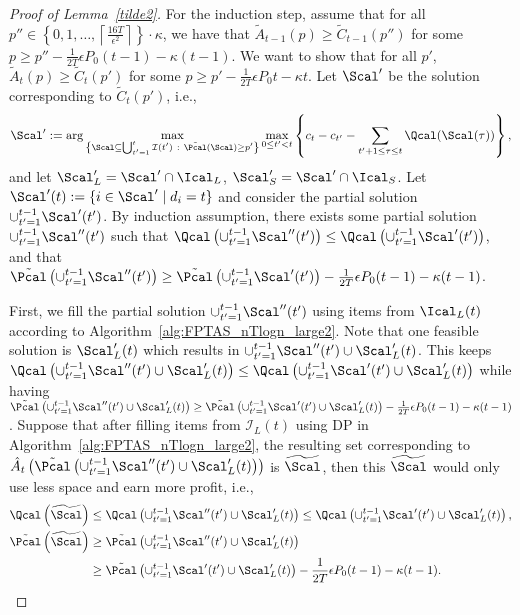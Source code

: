 \begin{proof}[Proof of Lemma~\ref{tilde2}]
	For the induction step, assume that for all $p''\in \left\{ 0, 1, \ldots,\left\lceil\frac{16T}{\epsilon^2}\right\rceil \right\} \cdot \kappa$, we have that $\widetilde{A}_{t-1}(p) \ge \widetilde{C}_{t-1}(p'')$ for some $p\ge p''-\frac{1}{2T}\epsilon P_0(t-1)-\kappa (t-1)$. We want to show that for all $p'$, $\widetilde{A}_{t}(p) \ge \widetilde{C}_{t}(p')$ for some $p\ge p'-\frac{1}{2T}\epsilon P_0t-\kappa t$. Let $\Scal'$ be the solution corresponding to $\widetilde{C}_t(p')$, i.e., $$\Scal' :=\arg\max_{\left\{\substack{
			\Scal \subseteq \bigcup_{t'=1}^t\mathcal{I}(t')\ :\  \tilde{\Pcal}(\Scal)\ge p'}
		\right\}} \max_{0 \leq t' < t}\left\{ c_t - c_{t'} - \sum_{t'+1 \leq \tau \leq  t} \Qcal(\Scal(\tau)) \right\},$$ and let $\Scal_L'=\Scal'\cap \Ical_L$, $\Scal'_S= \Scal'\cap\Ical_S$.
	Let $\Scal'(t) := \{i\in \Scal'\mid d_i=t\}$ and consider the partial solution $\cup_{t'=1}^{t-1}\Scal'(t')$. By induction assumption, there exists some partial solution $\cup_{t'=1}^{t-1}\Scal''(t')$ such that $\Qcal\left(\cup_{t'=1}^{t-1}\Scal''(t')\right)\le \Qcal\left(\cup_{t'=1}^{t-1}\Scal'(t')\right)$, and that $\tilde{\Pcal}\left(\cup_{t'=1}^{t-1}\Scal''(t')\right)\ge \tilde{\Pcal}\left(\cup_{t'=1}^{t-1}\Scal'(t')\right)-\frac{1}{2T}\epsilon P_0(t-1)-\kappa(t-1)$. 
	
	First, we fill the partial solution $\cup_{t'=1}^{t-1}\Scal''(t')$ using items from $\Ical_L(t)$ according to Algorithm~\ref{alg:FPTAS_nTlogn_large2}. Note that one feasible solution is $\Scal_L'(t)$ which results in $\cup_{t'=1}^{t-1}\Scal''(t')\cup \Scal_L'(t)$. This keeps $\Qcal\left(\cup_{t'=1}^{t-1}\Scal''(t')\cup \Scal_L'(t)\right)\le \Qcal\left(\cup_{t'=1}^{t-1}\Scal'(t')\cup \Scal_L'(t)\right)$ 
	while having $\tilde{\Pcal}\left(\cup_{t'=1}^{t-1}\Scal''(t')\cup \Scal_L'(t)\right)\ge \tilde{\Pcal}\left(\cup_{t'=1}^{t-1}\Scal'(t')\cup \Scal_L'(t)\right)-\frac{1}{2T}\epsilon P_0(t-1)-\kappa(t-1)$. Suppose that after filling items from $\mathcal{I}_L(t)$ using DP in Algorithm~\ref{alg:FPTAS_nTlogn_large2}, the resulting set corresponding to $\hat{A}_t\left( \tilde{\Pcal}\left(\cup_{t'=1}^{t-1}\Scal''(t')\cup \Scal_L'(t)\right) \right)$ is $\widetilde{\Scal}$, then this $\widetilde{\Scal}$ would only use less space and earn more profit, i.e.,
	\begin{align*}
	\Qcal\left(\widetilde{\Scal}\right)&\le \Qcal\left(\cup_{t'=1}^{t-1}\Scal''(t')\cup \Scal_L'(t)\right)\le \Qcal\left(\cup_{t'=1}^{t-1}\Scal'(t')\cup \Scal_L'(t)\right),\\
	\tilde{\Pcal}\left(\widetilde{\Scal}\right)&\ge \tilde{\Pcal}\left(\cup_{t'=1}^{t-1}\Scal''(t')\cup \Scal_L'(t)\right)\\
	&\ge \tilde{\Pcal}\left(\cup_{t'=1}^{t-1}\Scal'(t')\cup \Scal_L'(t)\right)-\frac{1}{2T}\epsilon P_0(t-1)-\kappa(t-1).
	\end{align*} 
	

\end{proof}
